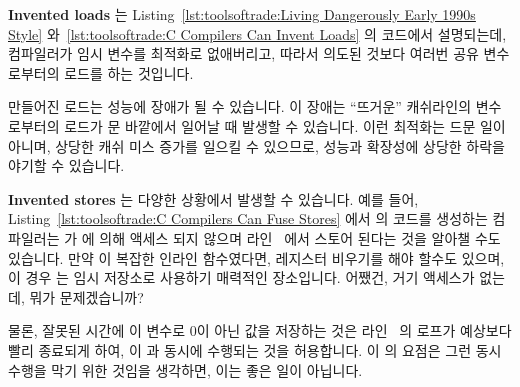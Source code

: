 \fi

{\bf Invented loads} 는
Listing~\ref{lst:toolsoftrade:Living Dangerously Early 1990s Style}
와~\ref{lst:toolsoftrade:C Compilers Can Invent Loads} 의 코드에서 설명되는데,
컴파일러가 임시 변수를 최적화로 없애버리고, 따라서 의도된 것보다 여러번 공유
변수로부터의 로드를 하는 것입니다.

만들어진 로드는 성능에 장애가 될 수 있습니다.
이 장애는 ``뜨거운'' 캐쉬라인의 변수로부터의 로드가  문 바깥에서 일어날
때 발생할 수 있습니다.
이런 최적화는 드문 일이 아니며, 상당한 캐쉬 미스 증가를 일으킬 수 있으므로,
성능과 확장성에 상당한 하락을 야기할 수 있습니다.

\begin{fcvref}
{\bf Invented stores} 는 다양한 상황에서 발생할 수 있습니다.
예를 들어,
Listing~\ref{lst:toolsoftrade:C Compilers Can Fuse Stores}
에서  의 코드를 생성하는 컴파일러는
 가  에 의해 액세스 되지 않으며
라인~ 에서 스토어 된다는 것을 알아챌 수도 있습니다.
만약  이 복잡한 인라인 함수였다면, 레지스터 비우기를 해야
할수도 있으며, 이 경우  는 임시 저장소로 사용하기 매력적인
장소입니다.
어쨌건, 거기 액세스가 없는데, 뭐가 문제겠습니까?

물론, 잘못된 시간에 이 변수로 0이 아닌 값을 저장하는 것은 라인~
의  로프가 예상보다 빨리 종료되게 하여,  이
 과 동시에 수행되는 것을 허용합니다.
이  의 요점은 그런 동시 수행을 막기 위한 것임을 생각하면, 이는 좋은
일이 아닙니다.
\end{fcvref}

\iffalse

